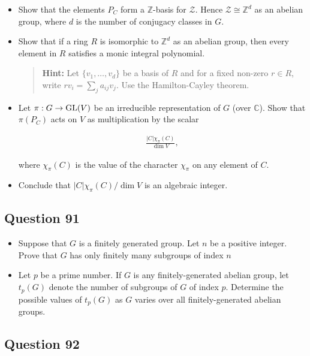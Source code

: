 \documentclass[12pt]{article}
\begin{document}
\begin{itemize}
\item
  Show that the elements \(P_C\) form a \(\mathbb Z\)-basis for
  \(\mathcal Z\). Hence \(\mathcal Z\cong\mathbb Z^d\) as an abelian
  group, where \(d\) is the number of conjugacy classes in \(G\).
\item
  Show that if a ring \(R\) is isomorphic to \(\mathbb Z^d\) as an
  abelian group, then every element in \(R\) satisfies a monic integral
  polynomial.

  \begin{quote}
  \textbf{Hint:} Let \(\{v_1,\dots,v_d\}\) be a basis of \(R\) and for a
  fixed non-zero \(r\in R\), write \(rv_i=\sum_j a_{ij}v_j\). Use the
  Hamilton-Cayley theorem.
  \end{quote}
\item
  Let \(\pi:G\rightarrow{\text{GL}}(V)\) be an irreducible representation of
  \(G\) (over \(\mathbb C\)). Show that \(\pi(P_C)\) acts on \(V\) as
  multiplication by the scalar

  \begin{align*}
  \frac{|C|\chi_{\pi}(C)}{\dim V},
  \end{align*}

  where \(\chi_{\pi}(C)\) is the value of the character \(\chi_{\pi}\)
  on any element of \(C\).
\item
  Conclude that \(|C|\chi_{\pi}(C)/\dim V\) is an algebraic integer.
\end{itemize}

\hypertarget{question-91}{%
\subsection{Question 91}\label{question-91}}

\begin{itemize}
\item
  Suppose that \(G\) is a finitely generated group. Let \(n\) be a
  positive integer. Prove that \(G\) has only finitely many subgroups of
  index \(n\)
\item
  Let \(p\) be a prime number. If \(G\) is any finitely-generated
  abelian group, let \(t_p(G)\) denote the number of subgroups of \(G\)
  of index \(p\). Determine the possible values of \(t_p(G)\) as \(G\)
  varies over all finitely-generated abelian groups.
\end{itemize}

\hypertarget{question-92}{%
\subsection{Question 92}\label{question-92}}
\end{document}
